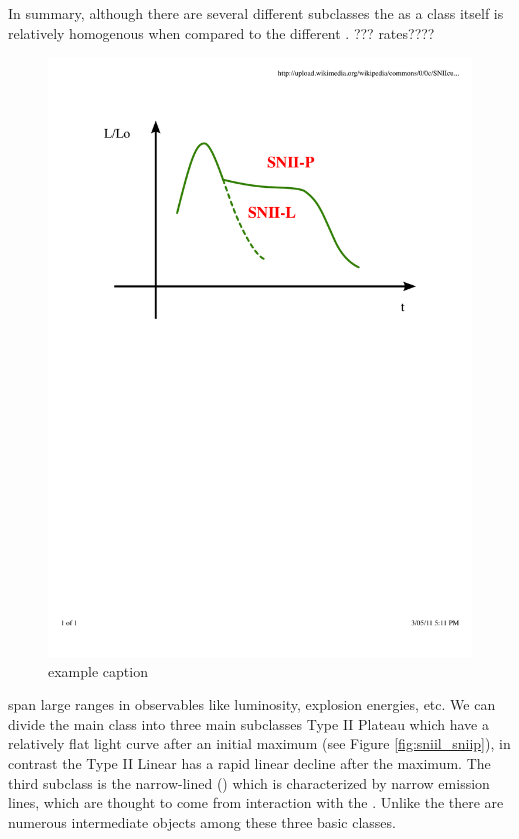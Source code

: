In summary, although there are several different subclasses the \snia as a class itself is relatively homogenous when compared to the different \sneii. ??? rates????

\begin{figure}[htbp] %
   \centering
   \includegraphics[width=\textwidth]{chapter_intro/plots/snii_lc_comparison.pdf} 
   \caption{example caption}
   \label{fig:snii_lc_comparison}
\end{figure}
\sneii span large ranges in observables like luminosity, explosion energies, etc. We can divide the main class into three main subclasses Type II Plateau \citet[\sniip][]{1979A&A....72..287B} which have a relatively flat light curve after an initial maximum (see Figure \ref{fig:sniil_sniip}), in contrast the Type II Linear \cite[\sniil][]{1990MNRAS.244..269S} has a rapid linear decline after the maximum. The third subclass is the narrow-lined \snii (\sniin) which is characterized by narrow emission lines, which are thought to come from interaction with the \csm. Unlike the \sneia there are numerous intermediate objects among these three basic classes. 


